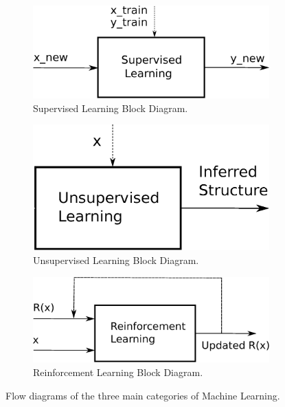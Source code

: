 	\begin{figure}[ht]
		\begin{center}
		\begin{subfigure}{\linewidth}
		\centering
		\includegraphics[scale=0.4]{figures/supervisedLearningBlock.eps}
		\caption{Supervised Learning Block Diagram.}
		\end{subfigure}
		\end{center}
		\begin{center}
		\begin{subfigure}{\linewidth}		
		\centering
		\includegraphics[scale=0.4]{figures/unsupervisedLearningBlock.eps}
		\caption{Unsupervised Learning Block Diagram.}
		\end{subfigure}
		\end{center}
		\begin{center}
		\begin{subfigure}{\linewidth}
			\centering
			\includegraphics[scale=0.4]{figures/reinforcementLearningBlock.eps}
			\caption{Reinforcement Learning Block Diagram.}
		\end{subfigure}
		\end{center}
		\caption{Flow diagrams of the three main categories of Machine Learning.}\label{bg:SupLearnEx}
	\end{figure}

